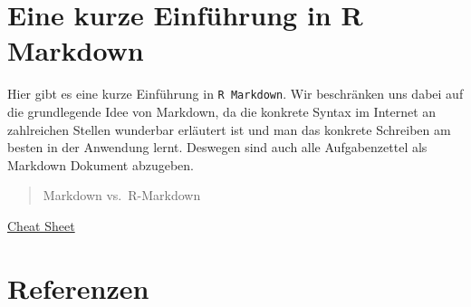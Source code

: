 \documentclass[]{tufte-book}
\begin{document}
\appendix


\chapter{Eine kurze Einführung in R Markdown}\label{markdown}

Hier gibt es eine kurze Einführung in \texttt{R\ Markdown}. Wir
beschränken uns dabei auf die grundlegende Idee von Markdown, da die
konkrete Syntax im Internet an zahlreichen Stellen wunderbar erläutert
ist und man das konkrete Schreiben am besten in der Anwendung lernt.
Deswegen sind auch alle Aufgabenzettel als Markdown Dokument abzugeben.

\begin{quote}
Markdown vs.~R-Markdown
\end{quote}

\href{https://rstudio.com/wp-content/uploads/2016/03/rmarkdown-cheatsheet-2.0.pdf}{Cheat
Sheet}

\chapter{Referenzen}\label{refs}


\end{document}
